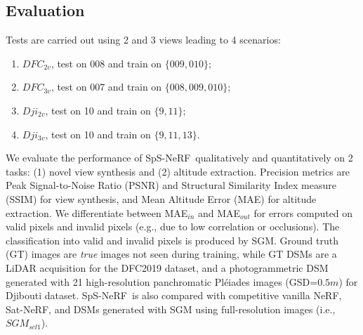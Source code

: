 \documentclass{isprs} %
\newcommand{\Nerf}{{NeRF}}
\newcommand{\OurNeRFShort}{{SpS-NeRF}}
\newcommand{\er}[1]{\textcolor{magenta}{#1}} %
\begin{document}





\subsection{Evaluation}
Tests are carried out using 2 and 3 views leading to 4 scenarios:
\begin{enumerate}
    \item $DFC_{2v}$, test on 008 and train on $\{009, 010\}$;
    \item $DFC_{3v}$, test on 007 and train on $\{008, 009, 010\}$;
    \item $Dji_{2v}$, {test on 10 and train on $\{9, 11\}$;}
    \item $Dji_{3v}$, {test on 10 and train on $\{9, 11, 13\}$.} 
\end{enumerate}
    
We evaluate the performance of \OurNeRFShort~qualitatively and quantitatively on 2 tasks: (1) novel view synthesis and (2) altitude extraction. Precision metrics are Peak Signal-to-Noise Ratio (PSNR) and Structural Similarity Index measure (SSIM) \cite{wang2004image} for view synthesis, and Mean Altitude Error (MAE) for altitude extraction. We differentiate between MAE$_{in}$ and MAE$_{out}$ for errors computed on valid pixels and invalid pixels (e.g., due to low correlation or occlusions). The classification into valid and invalid pixels is produced by SGM. Ground truth (GT) images are \textit{true} images not seen during training, while GT DSMs are a LiDAR acquisition for the DFC2019 dataset, and a photogrammetric DSM generated with 21 high-resolution panchromatic Pléiades images (GSD=$0.5m$) for Djibouti dataset. \OurNeRFShort~is also compared with competitive vanilla \Nerf, Sat-\Nerf, {and DSMs generated with SGM using full-resolution images (i.e., $SGM_{scl1}$)}. %

\end{document}
